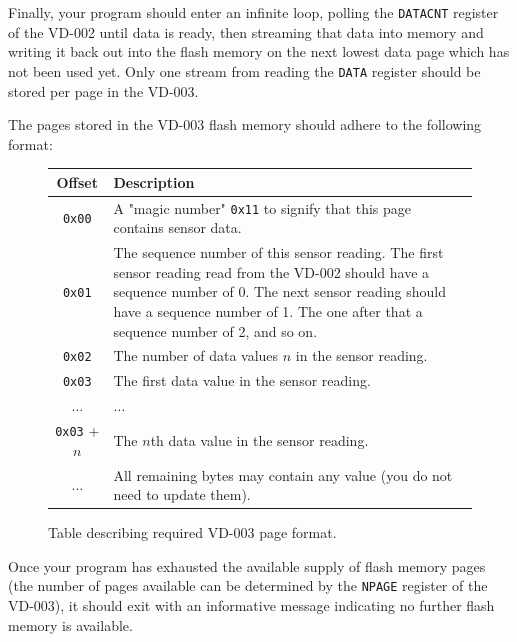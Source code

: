 \documentclass{article}
\begin{document}
Finally, your program should enter an infinite loop, polling the
\texttt{DATACNT} register of the VD-002 until data is ready, then streaming
that data into memory and writing it back out into the flash memory on the next
lowest data page which has not been used yet. Only one stream from reading the
\texttt{DATA} register should be stored per page in the VD-003.

The pages stored in the VD-003 flash memory should adhere to the following
format:

\begin{figure}[H]

	\centering

	\begin{tabular}{c | p{} }

		Offset & Description \\ \hline\hline

		\texttt{0x00} & A "magic number" \texttt{0x11} to signify that
		this page contains sensor data. \\ \hline

		\texttt{0x01} & The sequence number of this sensor reading. The
		first sensor reading read from the VD-002 should have a
		sequence number of 0. The next sensor reading should have a
		sequence number of 1. The one after that a sequence number of
		2, and so on. \\ \hline

		\texttt{0x02} & The number of data values $n$ in the sensor reading. \\ \hline

		\texttt{0x03} & The first data value in the sensor reading. \\ \hline

		$\dots$ & $\dots$ \\ \hline

		\texttt{0x03} + $n$ & The $n$th data value in the sensor reading. \\ \hline

		$\dots$ & All remaining bytes may contain any value (you do not need to update them). \\

	\end{tabular}

	\caption{Table describing required VD-003 page format.}

\end{figure}

Once your program has exhausted the available supply of flash memory pages (the
number of pages available can be determined by the \texttt{NPAGE} register of
the VD-003), it should exit with an informative message indicating no further
flash memory is available.
\end{document}
